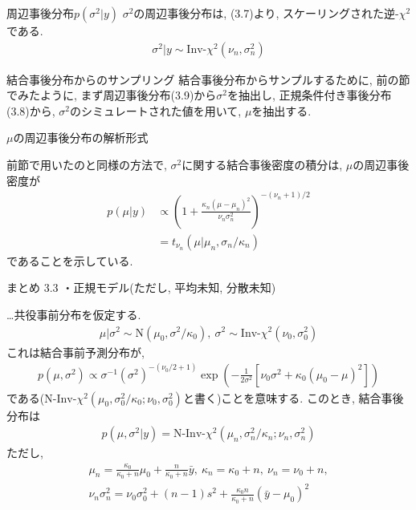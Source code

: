 \documentclass[10pt,dvipdfmx,a4]{beamer}
\newcommand{\eq}[1]{\begin{align}#1\end{align}}
\newcommand{\eqn}[1]{\begin{align*}#1\end{align*}}
\begin{document}

\begin{frame}{周辺事後分布$p(\sigma^2|y)$}
$\sigma^2$の周辺事後分布は, (3.7)より, スケーリングされた逆-$\chi^2$である.
\eq{\sigma^2|y\sim\text{Inv-}\chi^2(\nu_n,\sigma_n^2)}
\end{frame}


\begin{frame}{結合事後分布からのサンプリング}
結合事後分布からサンプルするために, 前の節でみたように, まず周辺事後分布(3.9)から$\sigma^2$を抽出し, 正規条件付き事後分布(3.8)から, $\sigma^2$のシミュレートされた値を用いて, $\mu$を抽出する.
\end{frame}


\begin{frame}{$\mu$の周辺事後分布の解析形式}

前節で用いたのと同様の方法で, $\sigma^2$に関する結合事後密度の積分は, $\mu$の周辺事後密度が
\eqn{p(\mu|y)&\propto \left(1+\frac{\kappa_n(\mu-\mu_n)^2}{\nu_n\sigma^2_n}\right)^{-(\nu_n+1)/2}\\
&=t_{\nu_n}(\mu|\mu_n,\sigma_n/\kappa_n)}
であることを示している.
\end{frame}


\begin{frame}[t]{まとめ 3.3}
・正規モデル(ただし, 平均未知, 分散未知)

…共役事前分布を仮定する.
\eqn{\mu|\sigma^2\sim \text{N}(\mu_0,\sigma^2/\kappa_0),\ \sigma^2\sim \text{Inv-}\chi^2(\nu_0,\sigma_0^2)}
これは結合事前予測分布が,
\eqn{p(\mu,\sigma^2)\propto \sigma^{-1}(\sigma^2)^{-(\nu_0/2+1)}\exp\left(-\frac{1}{2\sigma^2}[\nu_0\sigma^2+\kappa_0(\mu_0-\mu)^2]\right)}
である($\text{N-Inv-}\chi^2(\mu_0,\sigma^2_0/\kappa_0;\nu_0,\sigma^2_0)$と書く)ことを意味する.
このとき, 結合事後分布は
\eqn{p(\mu,\sigma^2|y)=\text{N-Inv-}\chi^2(\mu_n,\sigma^2_n/\kappa_n;\nu_n,\sigma_n^2)}
ただし,
\eqn{\mu_n=\tfrac{\kappa_0}{\kappa_0+n}\mu_0+\tfrac{n}{\kappa_0+n}\bar{y},\ \kappa_n=\kappa_0+n,\ \nu_n=\nu_0+n,\\\nu_n\sigma_n^2=\nu_0\sigma^2_0+(n-1)s^2+\tfrac{\kappa_0n}{\kappa_0+n}(\bar{y}-\mu_0)^2}
\end{frame}

\end{document}
